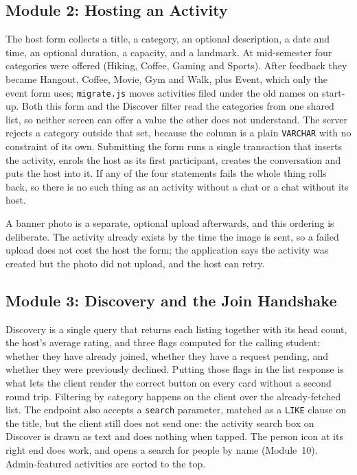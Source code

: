 \documentclass{tietreport}
\begin{document}
\subsection{Module 2: Hosting an Activity}

The host form collects a title, a category, an optional description, a date and time,
an optional duration, a capacity, and a landmark. At mid-semester four categories were
offered (Hiking, Coffee, Gaming and Sports). After feedback they became Hangout, Coffee,
Movie, Gym and Walk, plus Event, which only the event form uses; \texttt{migrate.js}
moves activities filed under the old names on start-up. Both this form and the Discover
filter read the categories from one shared list, so neither screen
can offer a value the other does not understand. The server rejects a category outside
that set, because the column is a plain \texttt{VARCHAR} with no constraint of its own.
Submitting the form runs a single transaction that inserts the
activity, enrols the host as its first participant, creates the conversation and puts
the host into it. If any of the four statements fails the whole thing rolls back, so
there is no such thing as an activity without a chat or a chat without its host.

A banner photo is a separate, optional upload afterwards, and this ordering is
deliberate. The activity already exists by the time the image is sent, so a failed
upload does not cost the host the form; the application says the activity was created
but the photo did not upload, and the host can retry.

\subsection{Module 3: Discovery and the Join Handshake}

Discovery is a single query that returns each listing together with its head count, the
host's average rating, and three flags computed for the calling student: whether they
have already joined, whether they have a request pending, and whether they were
previously declined. Putting those flags in the list response is what lets the client
render the correct button on every card without a second round trip. Filtering by
category happens on the client over the already-fetched list. The endpoint also accepts
a \texttt{search} parameter, matched as a \texttt{LIKE} clause on the title, but the
client still does not send one: the activity search box on Discover is drawn as text and
does nothing when tapped. The person icon at its right end does work, and opens a search
for people by name (Module~10). Admin-featured activities are sorted to the top.
\end{document}
